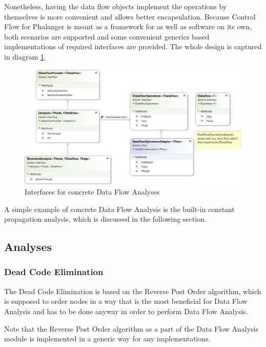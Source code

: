         Nonetheless, having the data flow objects implement the operations by 
        themselves is more convenient and allows better encapsulation. 
        Because Control Flow for Phalanger is meant as a framework for as 
        well as software on its own, both scenarios are supported and 
        some convenient generics based implementations of required 
        interfaces are provided. The whole design is captured in 
        diagram \ref{dataflowifaces}.
        
\begin{figure}[h]  
  \centering
    \includegraphics*[width=\textwidth,height=\textheight,keepaspectratio]{img/dataflow-ifaces.png}  
    \caption{Interfaces for concrete Data Flow Analyses\label{dataflowifaces}}
\end{figure}

        A simple example of concrete Data Flow Analysis is the built-in 
        constant propagation analysis, which is discussed in the 
        following section.        
    
    \subsection{Analyses}
        \subsubsection*{Dead Code Elimination}
        
        The Dead Code Elimination is based on the Reverse Post Order 
        algorithm, which is supposed to order nodes in a way that 
        is the most beneficial for Data Flow Analysis and has to be 
        done anyway in order to perform Data Flow Analysis.
        
        Note that the Reverse Post Order algorithm as a part 
        of the Data Flow Analysis module is implemented 
        in a generic way for any  implementations. 
        
